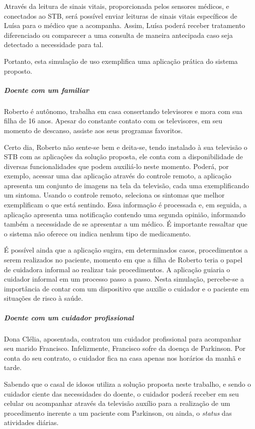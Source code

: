 Através da leitura de sinais vitais, proporcionada pelos sensores médicos,
e conectados ao STB, será possível enviar leituras de sinais vitais específicos 
de Luísa para o médico que a acompanha. Assim, Luísa poderá receber tratamento
diferenciado ou comparecer a uma consulta de maneira antecipada caso seja
detectado a necessidade para tal.

Portanto, esta simulação de uso exemplifica uma aplicação prática do sistema 
proposto.

\subparagraph{Doente com um familiar}

Roberto é autônomo, trabalha em casa consertando televisores e mora com sua
filha de 16 anos. Apesar do constante contato com os televisores, em seu momento
de descanso, assiste aos seus programas favoritos.

Certo dia, Roberto não sente-se bem e deita-se, tendo instalado à sua televisão
o STB com as aplicações da solução proposta, ele conta com a disponibilidade de
diversas funcionalidades que podem auxiliá-lo neste momento. Poderá, por
exemplo, acessar uma das aplicação através do controle remoto, a aplicação
apresenta um conjunto de imagens na tela da televisão, cada uma exemplificando
um sintoma.  Usando o controle remoto, seleciona os sintomas que melhor
exemplificam o que está sentindo. Essa informação é processada e, em seguida, a
aplicação apresenta uma notificação contendo uma segunda opinião, informando
também a necessidade de se apresentar a um médico. É importante ressaltar que
o sistema não oferece ou indica nenhum tipo de medicamento.

É possível ainda que a aplicação sugira, em determinados casos, procedimentos a
serem realizados no paciente, momento em que a filha de Roberto teria o papel de
cuidadora informal ao realizar tais procedimentos. A aplicação guiaria o
cuidador informal em um processo passo a passo. Nesta simulação,  percebe-se a
importância de contar com um dispositivo que auxilie o cuidador e o paciente em
situações de risco à saúde.

\subparagraph{Doente com um cuidador profissional}

Dona Clélia, aposentada, contratou um cuidador profissional para acompanhar seu
marido Francisco. Infelizmente, Francisco sofre da doença de Parkinson. Por conta
do seu contrato, o cuidador fica na casa apenas nos horários da manhã e tarde.

Sabendo que o casal de idosos utiliza a solução proposta neste trabalho, e sendo o
cuidador ciente das necessidades do doente, o cuidador poderá receber em seu celular ou
acompanhar através da televisão auxílio para a realização de um procedimento inerente
a um paciente com Parkinson, ou ainda, o \textit{status} das atividades diárias.

